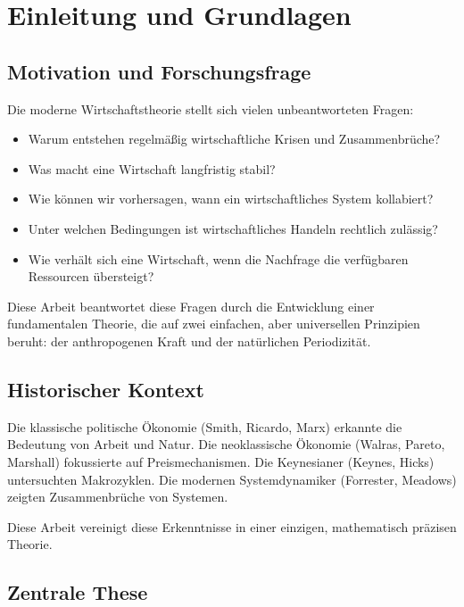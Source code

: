 \documentclass[a4paper,11pt]{report}
\theoremstyle{definition}
\begin{document}
\tableofcontents

\newpage

\chapter{Einleitung und Grundlagen}

\section{Motivation und Forschungsfrage}

Die moderne Wirtschaftstheorie stellt sich vielen unbeantworteten Fragen:

\begin{itemize}
    \item Warum entstehen regelmäßig wirtschaftliche Krisen und Zusammenbrüche?
    \item Was macht eine Wirtschaft langfristig stabil?
    \item Wie können wir vorhersagen, wann ein wirtschaftliches System kollabiert?
    \item Unter welchen Bedingungen ist wirtschaftliches Handeln rechtlich zulässig?
    \item Wie verhält sich eine Wirtschaft, wenn die Nachfrage die verfügbaren Ressourcen übersteigt?
\end{itemize}

Diese Arbeit beantwortet diese Fragen durch die Entwicklung einer fundamentalen Theorie, die auf zwei einfachen, aber universellen Prinzipien beruht: der anthropogenen Kraft und der natürlichen Periodizität.

\section{Historischer Kontext}

Die klassische politische Ökonomie (Smith, Ricardo, Marx) erkannte die Bedeutung von Arbeit und Natur. Die neoklassische Ökonomie (Walras, Pareto, Marshall) fokussierte auf Preismechanismen. Die Keynesianer (Keynes, Hicks) untersuchten Makrozyklen. Die modernen Systemdynamiker (Forrester, Meadows) zeigten Zusammenbrüche von Systemen.

Diese Arbeit vereinigt diese Erkenntnisse in einer einzigen, mathematisch präzisen Theorie.

\section{Zentrale These}
\end{document}
